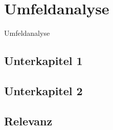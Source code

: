 \newpage

\section{Umfeldanalyse} \label{umfeldanalyse}
Umfeldanalyse

\subsection{Unterkapitel 1} \label{unterkapitel1}


\subsection{Unterkapitel 2} \label{unterkapitel2}


\subsection{Relevanz} \label{relevanz}

